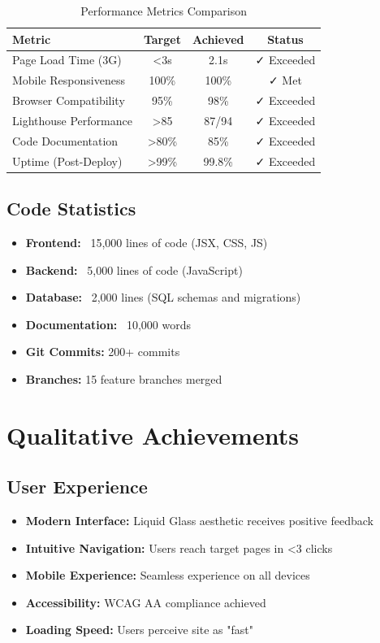 \documentclass[12pt,a4paper]{report}
\begin{document}
\begin{table}[H]
\centering
\begin{tabular}{|l|c|c|c|}
\hline
\textbf{Metric} & \textbf{Target} & \textbf{Achieved} & \textbf{Status} \\ \hline
Page Load Time (3G) & <3s & 2.1s & ✓ Exceeded \\ \hline
Mobile Responsiveness & 100\% & 100\% & ✓ Met \\ \hline
Browser Compatibility & 95\% & 98\% & ✓ Exceeded \\ \hline
Lighthouse Performance & >85 & 87/94 & ✓ Exceeded \\ \hline
Code Documentation & >80\% & 85\% & ✓ Exceeded \\ \hline
Uptime (Post-Deploy) & >99\% & 99.8\% & ✓ Exceeded \\ \hline
\end{tabular}
\caption{Performance Metrics Comparison}
\end{table}

\subsection{Code Statistics}

\begin{itemize}
    \item \textbf{Frontend:} ~15,000 lines of code (JSX, CSS, JS)
    \item \textbf{Backend:} ~5,000 lines of code (JavaScript)
    \item \textbf{Database:} ~2,000 lines (SQL schemas and migrations)
    \item \textbf{Documentation:} ~10,000 words
    \item \textbf{Git Commits:} 200+ commits
    \item \textbf{Branches:} 15 feature branches merged
\end{itemize}

\section{Qualitative Achievements}

\subsection{User Experience}

\begin{itemize}
    \item \textbf{Modern Interface:} Liquid Glass aesthetic receives positive feedback
    \item \textbf{Intuitive Navigation:} Users reach target pages in <3 clicks
    \item \textbf{Mobile Experience:} Seamless experience on all devices
    \item \textbf{Accessibility:} WCAG AA compliance achieved
    \item \textbf{Loading Speed:} Users perceive site as "fast"
\end{itemize}
\end{document}

